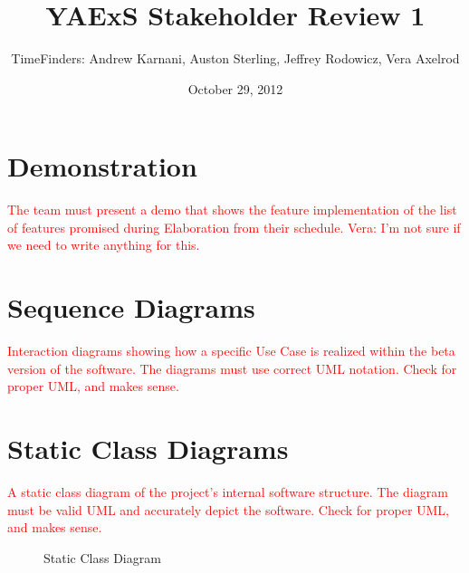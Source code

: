 \documentclass[11pt]{article}
\title{\bf YAExS Stakeholder Review 1}
\author{TimeFinders: Andrew Karnani, Auston Sterling, Jeffrey Rodowicz, Vera Axelrod}
\date{October 29, 2012}
\begin{document}
\maketitle

\section*{Demonstration} %
\textcolor{red}{
The team must present a demo that shows the feature implementation of the list of features promised during Elaboration from their schedule.
Vera: I'm not sure if we need to write anything for this.}



\section*{Sequence Diagrams} %
\textcolor{red}{
Interaction diagrams showing how a specific Use Case is realized within the beta version of the software. The diagrams must use correct UML notation.  Check for proper UML, and makes sense.}

\begin{figure}
	\centering
	\caption{}
	\label{fig:seqDiagram1}
\end{figure}

\begin{figure}
	\centering
	\caption{}
	\label{fig:seqDiagram2}
\end{figure}



\section*{Static Class Diagrams}  %
\textcolor{red}{
A static class diagram of the project's internal software structure. The diagram must be valid UML and accurately depict the software.  Check for proper UML, and makes sense.}



\begin{figure}
	\centering
	\caption{Static Class Diagram}
	\label{fig:staticDiagram}
\end{figure}
\end{document}
